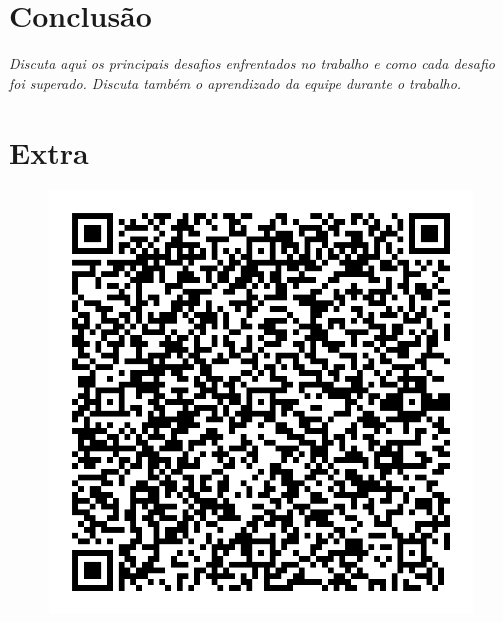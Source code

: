 \documentclass[12pt]{article}
\begin{document}
\section{Conclusão}

\emph{Discuta aqui os principais desafios enfrentados no trabalho e como
cada desafio foi superado. Discuta também o aprendizado 
da equipe durante o trabalho.}

\pagebreak
\section{Extra}

\begin{figure}[h]
    \centering
    \includegraphics[scale=0.3]{imagens/extra.jpg}
\end{figure}
\end{document}
